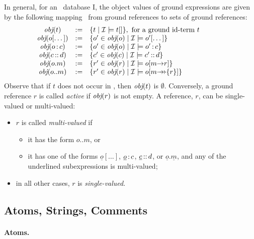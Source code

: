 \documentclass[11pt]{report}
\begin{document}
In general, for an \fl\ database \db I, the object values of ground
expressions are given by the following mapping \obj\ from ground references
to sets of ground references:
%
\begin{displaymath}
  \begin{array}{cll@{\hspace{4em}}c}
    \obj(t) & := & \{t \mid  \db I\models t[] \}, 
     \textrm{ for a ground id-term $t$}  \\   
    \obj(o[\dots]) & :=& \{o'\in\obj(o) \mid \db I \models o'[\dots]
    \} \\  
    \obj(o\isa c) & := & \{o'\in\obj(o) \mid \db I \models o'\isa c\}
     \\ 
    \obj(c\subcl d) & := & \{c'\in\obj(c) \mid \db I \models c'\subcl
    d\} \\ 
    \obj(o.m) & :=  & \{r'\in\obj(r) \mid \db I \models o[m\fd
    r]\} \\ 
    \obj(o..m) & := &  \{ r'\in\obj(r) \mid \db I \models
    o[m{\mvd}\{r\}] \}
  \end{array}
\end{displaymath}
Observe that if $t$ does not occur in , then $\textit{obj}(t)$ is
$\emptyset$.  Conversely, a ground reference $r$ is called \emph{active} if
$\textit{obj}(r)$ is not empty. A reference, $r$, can be 
single-valued or multi-valued:
\begin{itemize}
\item $r$ is called \emph{multi-valued} if
 \begin{itemize}
  \item it has the form $o..m$, or 
  \item it has one of the forms $\underline{o}[\dots]$,
    $\underline{o}\,{\bf{:}}\, c$, $\underline{c}\,{\bf{::}}\, d$, or
    $\underline{o}.\underline{m}$, and any of the underlined
    subexpressions is multi-valued;
 \end{itemize}
\item in all other cases, $r$ is \emph{single-valued}.
\end{itemize}


\subsection{Atoms, Strings, Comments}

\paragraph{Atoms.}
\end{document}
